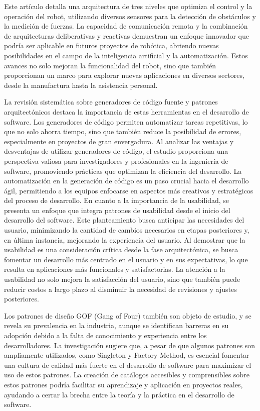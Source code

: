 \documentclass[twocolumn]{article}
\begin{document}
Este artículo detalla una arquitectura de tres niveles que optimiza el control y la operación del robot, utilizando diversos sensores para la detección de obstáculos y la medición de fuerzas. La capacidad de comunicación remota y la combinación de arquitecturas deliberativas y reactivas demuestran un enfoque innovador que podría ser aplicable en futuros proyectos de robótica, abriendo nuevas posibilidades en el campo de la inteligencia artificial y la automatización. Estos avances no solo mejoran la funcionalidad del robot, sino que también proporcionan un marco para explorar nuevas aplicaciones en diversos sectores, desde la manufactura hasta la asistencia personal.

La revisión sistemática sobre generadores de código fuente y patrones arquitectónicos destaca la importancia de estas herramientas en el desarrollo de software. Los generadores de código permiten automatizar tareas repetitivas, lo que no solo ahorra tiempo, sino que también reduce la posibilidad de errores, especialmente en proyectos de gran envergadura. Al analizar las ventajas y desventajas de utilizar generadores de código, el estudio proporciona una perspectiva valiosa para investigadores y profesionales en la ingeniería de software, promoviendo prácticas que optimizan la eficiencia del desarrollo. La automatización en la generación de código es un paso crucial hacia el desarrollo ágil, permitiendo a los equipos enfocarse en aspectos más creativos y estratégicos del proceso de desarrollo.
En cuanto a la importancia de la usabilidad, se presenta un enfoque que integra patrones de usabilidad desde el inicio del desarrollo del software. Este planteamiento busca anticipar las necesidades del usuario, minimizando la cantidad de cambios necesarios en etapas posteriores y, en última instancia, mejorando la experiencia del usuario. Al demostrar que la usabilidad es una consideración crítica desde la fase arquitectónica, se busca fomentar un desarrollo más centrado en el usuario y en sus expectativas, lo que resulta en aplicaciones más funcionales y satisfactorias. La atención a la usabilidad no solo mejora la satisfacción del usuario, sino que también puede reducir costos a largo plazo al disminuir la necesidad de revisiones y ajustes posteriores.

Los patrones de diseño GOF (Gang of Four) también son objeto de estudio, y se revela su prevalencia en la industria, aunque se identifican barreras en su adopción debido a la falta de conocimiento y experiencia entre los desarrolladores. La investigación sugiere que, a pesar de que algunos patrones son ampliamente utilizados, como Singleton y Factory Method, es esencial fomentar una cultura de calidad más fuerte en el desarrollo de software para maximizar el uso de estos patrones. La creación de catálogos accesibles y comprensibles sobre estos patrones podría facilitar su aprendizaje y aplicación en proyectos reales, ayudando a cerrar la brecha entre la teoría y la práctica en el desarrollo de software.
\end{document}
